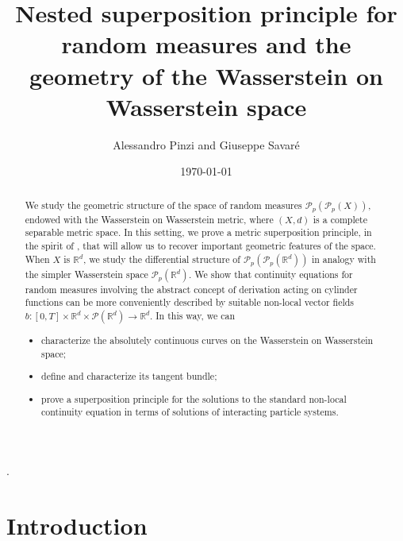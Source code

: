 \documentclass[10pt,leqno]{amsart}
\title[Superposition for random measures and geometry of the WoW space]{Nested superposition principle for  random measures and the geometry of the Wasserstein on Wasserstein space}
\author{Alessandro Pinzi and Giuseppe Savar\'e}
\date{\today}
\numberwithin{equation}{section}
\newcommand{\R}{\mathbb{R}}
\newcommand{\PP}{\mathcal{P}}
\begin{document}
\begin{abstract}
    We study the geometric structure of the space of random measures \(\mathcal{P}_p(\mathcal{P}_p(X))\), endowed with the Wasserstein 
    on Wasserstein metric, where \((X, d)\) is a complete separable metric space. In this setting, we prove a metric superposition principle, in the spirit of \cite{lisini2007characterization}, that will allow us to recover important geometric features of the space.
    \\
    When $X$ is $\R^d$, we study the 
    differential structure of $\PP_p(\PP_p(\R^d))$ in analogy with the simpler Wasserstein space $\PP_p(\R^d)$. We 
    show that 
    continuity equations for random measures 
    involving the abstract concept of derivation acting on cylinder functions 
    can be more conveniently described by 
    suitable non-local vector fields $b:[0,T]\times \R^d \times \PP(\R^d) \to \R^d$. In this way, we can 
    \begin{itemize}
        \item characterize the absolutely continuous curves on the Wasserstein on Wasserstein space;
        \item define and characterize its tangent bundle;
        \item prove a superposition principle for the solutions to the standard non-local continuity equation in terms of solutions of interacting particle systems.
    \end{itemize}
\end{abstract}

\maketitle

{\small
		.
		\par
	}

\tableofcontents
\newcommand{\GGG}{\color{blue}}
\newcommand{\nc}{\normalcolor}
\section{Introduction}
\end{document}
